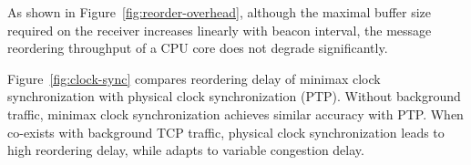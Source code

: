 As shown in Figure~\ref{fig:reorder-overhead}, although the maximal buffer size required on the receiver increases linearly with beacon interval, the message reordering throughput of a CPU core does not degrade significantly.

Figure~\ref{fig:clock-sync} compares reordering delay of minimax clock synchronization with physical clock synchronization (PTP). Without background traffic, minimax clock synchronization achieves similar accuracy with PTP. When \sys co-exists with background TCP traffic, physical clock synchronization leads to high reordering delay, while \sys adapts to variable congestion delay.

